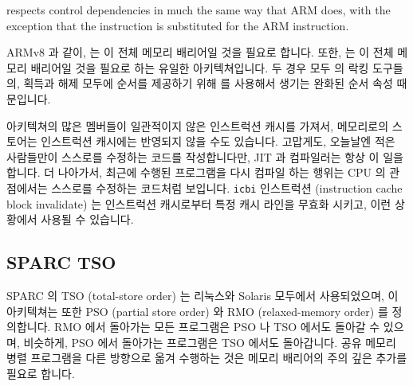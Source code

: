 \Power{} respects control dependencies in much the same way that ARM
does, with the exception that the \Power{}  instruction
is substituted for the ARM  instruction.
\fi

ARMv8 과 같이, \Power{} 는  이 전체 메모리 배리어일 것을 필요로 합니다.
또한, \Power{} 는  이 전체 메모리 배리어일 것을
필요로 하는 유일한 아키텍쳐입니다.
두 경우 모두 \Power{} 의 락킹 도구들의, 획득과 해제 모두에 순서를 제공하기 위해
 를 사용해서 생기는 완화된 순서 속성 때문입니다.

\Power{} 아키텍쳐의 많은 멤버들이 일관적이지 않은 인스트럭션 캐시를 가져서,
메모리로의 스토어는 인스트럭션 캐시에는 반영되지 않을 수도 있습니다.
고맙게도, 오늘날엔 적은 사람들만이 스스로를 수정하는 코드를 작성합니다만, JIT
과 컴파일러는 항상 이 일을 합니다.
더 나아가서, 최근에 수행된 프로그램을 다시 컴파일 하는 행위는 CPU 의 관점에서는
스스로를 수정하는 코드처럼 보입니다.
{\tt icbi} 인스트럭션 (instruction cache block invalidate) 는 인스트럭션
캐시로부터 특정 캐시 라인을 무효화 시키고, 이런 상황에서 사용될 수 있습니다.

\subsection{SPARC TSO}

SPARC 의 TSO (total-store order) 는 리눅스와 Solaris 모두에서 사용되었으며, 이
아키텍쳐는 또한 PSO (partial store order) 와 RMO (relaxed-memory order) 를
정의합니다.
RMO 에서 돌아가는 모든 프로그램은 PSO 나 TSO 에서도 돌아갈 수 있으며, 비슷하게,
PSO 에서 돌아가는 프로그램은 TSO 에서도 돌아갑니다.
공유 메모리 병렬 프로그램을 다른 방향으로 옮겨 수행하는 것은 메모리 배리어의
주의 깊은 추가를 필요로 합니다.

